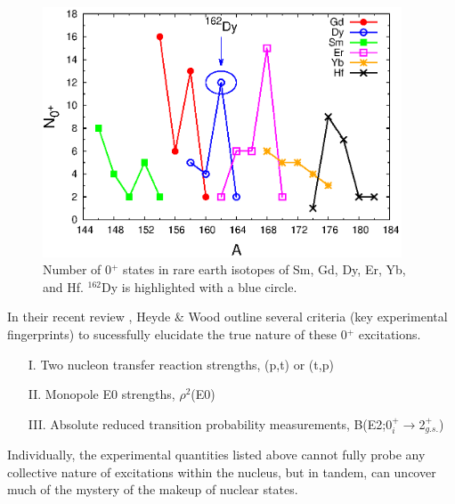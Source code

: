 \begin{figure}[ht]
\begin{center}
\includegraphics[width=0.95\textwidth]{Gd_Dy_0s_Number.eps}
\end{center}
\caption{Number of 0$^+$ states in rare earth isotopes of Sm, Gd, Dy, Er, Yb, and Hf. $^{162}$Dy is highlighted with a blue circle. \label{fig:Number_0s_Rare_Earth}}
\end{figure}
\newpage
In their recent review \cite{RevModPhys.83.1467}, Heyde \& Wood outline several criteria (key experimental fingerprints) to sucessfully elucidate the true nature of these 0$^+$ excitations. 

\begin{itemize}
\item[I.] Two nucleon transfer reaction strengths, (p,t) or (t,p)
\item[II.] Monopole E0 strengths, $\rho^2$(E0)
\item[III.] Absolute reduced transition probability measurements, B(E2;0$^+_i\rightarrow$2$^+_{g.s.}$)

\end{itemize}

Individually, the experimental quantities listed above cannot fully probe any collective nature of excitations within the nucleus, but in tandem, can uncover much of the mystery of the makeup of nuclear states.

